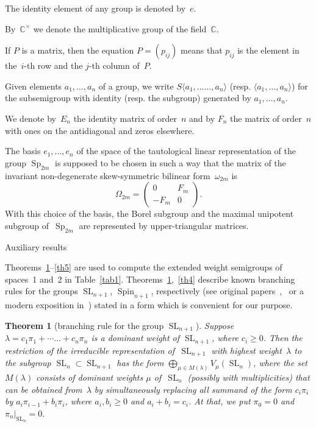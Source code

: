 \documentclass[12pt]{amsart}
\newtheorem{theorem}{Theorem}
\theoremstyle{definition}
\theoremstyle{remark}
\begin{document}
The identity element of any group is denoted by~$e$.

By~$\mathbb{C}^\times$ we denote the multiplicative group of the
field~$\mathbb{C}$.

If $P$ is a matrix, then the equation $P=(p_{ij})$ means that
$p_{ij}$ is the element in the~$i$-th row and the $j$-th column
of~$P$.

Given elements $a_1,\dots,a_n$ of a group, we write $S\langle
a_1,\dots\allowbreak\dots,a_n\rangle$ (resp. $\langle
a_1,\dots,a_n\rangle$) for the subsemigroup with identity (resp. the
subgroup) generated by $a_1,\dots,a_n$.

We denote by~$E_n$ the identity matrix of order~$n$ and by $F_n$ the
matrix of order~$n$ with ones on the antidiagonal and zeros
elsewhere.

The basis $e_1, \ldots, e_n$ of the space of the tautological linear
representation of the group ${\operatorname{Sp}}_{2m}$ is supposed to be chosen in
such a way that the matrix of the invariant non-degenerate
skew-symmetric bilinear form~$\omega_{2m}$ is
$$
\Omega_{2m}=
\begin{pmatrix}
0 & F_m
\\
-F_m & 0
\end{pmatrix}.
$$
With this choice of the basis, the Borel subgroup and the maximal
unipotent subgroup of~${\operatorname{Sp}}_{2m}$ are represented by
upper-triangular matrices.

{}{Auxiliary results}
\label{sec2}

{}{}
\label{ssec2.1} Theorems~\ref{th3}--\ref{th5} are used to compute
the extended weight semigroups of spaces~1 and~2 in
Table~\ref{tab1}. Theorems~\ref{th3},~\ref{th4} describe known
branching rules for the groups ${\operatorname{SL}}_{n+1}$, ${\operatorname{Spin}}_{n+1}$,
respectively (see original papers~\cite{14},~\cite{15} or a modern
exposition in~\cite{16}) stated in a form which is convenient for
our purpose.

\begin{theorem}[{\rm branching rule for the group ${\operatorname{SL}}_{n+1}$}]
\label{th3} Suppose
$\lambda=c_1\pi_1+\dotsb\allowbreak\dots+c_n\pi_n$ is a dominant
weight of ${\operatorname{SL}}_{n+1}$, where $c_i{\geqslant}0$. Then the restriction of the
irreducible representation of\, ${\operatorname{SL}}_{n+1}$ with highest
weight~$\lambda$ to the subgroup ${\operatorname{SL}}_n\subset{\operatorname{SL}}_{n+1}$ has the
form $\bigoplus \limits_{\mu\in M(\lambda)}V_\mu({\operatorname{SL}}_n)$, where the
set~$M(\lambda)$ consists of dominant weights $\mu$ of\, ${\operatorname{SL}}_n$
\textup{(}possibly with multiplicities\textup{)} that can be
obtained from~$\lambda$ by simultaneously replacing all summand of
the form $c_i\pi_i$ by $a_i\pi_{i-1}+b_i\pi_i$, where $a_i,b_i{\geqslant}0$
and $a_i+b_i=c_i$. At that, we put $\pi_0=0$ and
$\pi_n\big|_{{\operatorname{SL}}_n}=0$.
\end{theorem}
\end{document}
